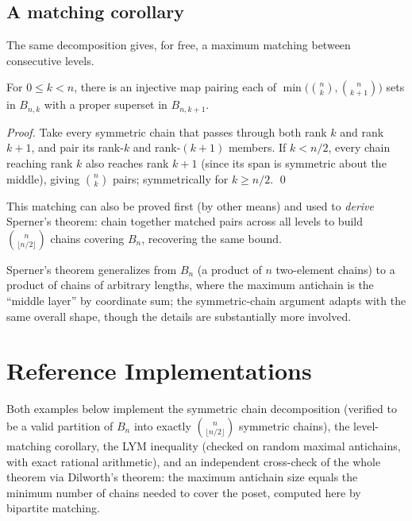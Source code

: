 \documentclass[11pt]{article}
\begin{document}
\subsection{A matching corollary}
The same decomposition gives, for free, a maximum matching between
consecutive levels.

\begin{theorembox}
For $0 \le k < n$, there is an injective map pairing each of
$\min\bigl(\binom{n}{k}, \binom{n}{k+1}\bigr)$ sets in $B_{n,k}$ with a
proper superset in $B_{n,k+1}$.

\emph{Proof.} Take every symmetric chain that passes through both rank $k$
and rank $k+1$, and pair its rank-$k$ and rank-$(k+1)$ members. If
$k < n/2$, every chain reaching rank $k$ also reaches rank $k+1$ (since
its span is symmetric about the middle), giving $\binom{n}{k}$ pairs;
symmetrically for $k \ge n/2$. \qed
\end{theorembox}

\begin{notebox}
This matching can also be proved first (by other means) and used to
\emph{derive} Sperner's theorem: chain together matched pairs across all
levels to build $\binom{n}{\lfloor n/2\rfloor}$ chains covering $B_n$,
recovering the same bound.
\end{notebox}

\begin{notebox}
Sperner's theorem generalizes from $B_n$ (a product of $n$ two-element
chains) to a product of chains of arbitrary lengths, where the maximum
antichain is the ``middle layer'' by coordinate sum; the symmetric-chain
argument adapts with the same overall shape, though the details are
substantially more involved.
\end{notebox}

\section{Reference Implementations}
Both examples below implement the symmetric chain decomposition (verified
to be a valid partition of $B_n$ into exactly $\binom{n}{\lfloor
n/2\rfloor}$ symmetric chains), the level-matching corollary, the LYM
inequality (checked on random maximal antichains, with exact rational
arithmetic), and an independent cross-check of the whole theorem via
Dilworth's theorem: the maximum antichain size equals the minimum number
of chains needed to cover the poset, computed here by bipartite matching.

\codenote
\end{document}
